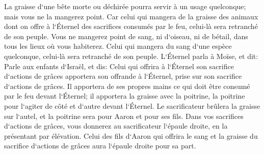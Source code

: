 \verse La graisse d`une bête morte ou déchirée pourra servir à un usage quelconque; mais vous ne la mangerez point. 
\verse Car celui qui mangera de la graisse des animaux dont on offre à l`Éternel des sacrifices consumés par le feu, celui-là sera retranché de son peuple. 
\verse Vous ne mangerez point de sang, ni d`oiseau, ni de bétail, dans tous les lieux où vous habiterez. 
\verse Celui qui mangera du sang d`une espèce quelconque, celui-là sera retranché de son peuple. 
\verse L`Éternel parla à Moïse, et dit: 
\verse Parle aux enfants d`Israël, et dis: Celui qui offrira à l`Éternel son sacrifice d`actions de grâces apportera son offrande à l`Éternel, prise sur son sacrifice d`actions de grâces. 
\verse Il apportera de ses propres mains ce qui doit être consumé par le feu devant l`Éternel; il apportera la graisse avec la poitrine, la poitrine pour l`agiter de côté et d`autre devant l`Éternel. 
\verse Le sacrificateur brûlera la graisse sur l`autel, et la poitrine sera pour Aaron et pour ses fils. 
\verse Dans vos sacrifices d`actions de grâces, vous donnerez au sacrificateur l`épaule droite, en la présentant par élévation. 
\verse Celui des fils d`Aaron qui offrira le sang et la graisse du sacrifice d`actions de grâces aura l`épaule droite pour sa part. 
